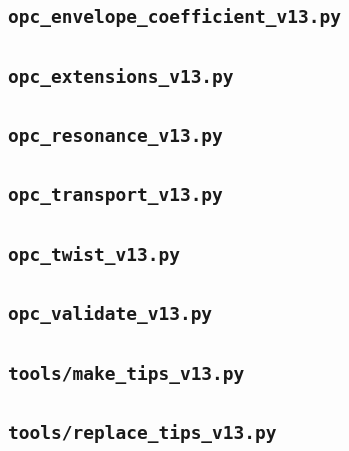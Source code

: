 \documentclass[preprint,12pt]{elsarticle}
\numberwithin{equation}{section}
\theoremstyle{plain}
\theoremstyle{definition}
\theoremstyle{remark}
\begin{document}
\subsection{\texttt{opc\_envelope\_coefficient\_v13.py}}


\subsection{\texttt{opc\_extensions\_v13.py}}


\subsection{\texttt{opc\_resonance\_v13.py}}


\subsection{\texttt{opc\_transport\_v13.py}}


\subsection{\texttt{opc\_twist\_v13.py}}


\subsection{\texttt{opc\_validate\_v13.py}}


\subsection{\texttt{tools/make\_tips\_v13.py}}


\subsection{\texttt{tools/replace\_tips\_v13.py}}

\end{document}
